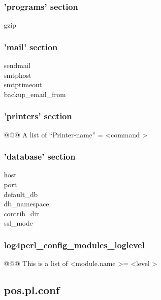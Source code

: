 \subsubsection{'programs' section}

\begin{description}
\item [gzip]
\end{description}


\subsubsection{'mail' section}

\begin{description}
\item [sendmail]
\item [smtphost]
\item [smtptimeout]
\item [backup\_email\_from]
\end{description}

\subsubsection{'printers' section}

@@@ A list of ``Printer-name'' = \textless command \textgreater


\subsubsection{'database' section}

\begin{description}
\item [host]
\item [port]
\item [default\_db]
\item [db\_namespace]
\item [contrib\_dir]
\item [ssl\_mode]
\end{description}

\subsubsection{log4perl\_config\_modules\_loglevel}

@@@ This is a list of \textless module.name \textgreater = \textless level \textgreater


\subsection{pos.pl.conf}

